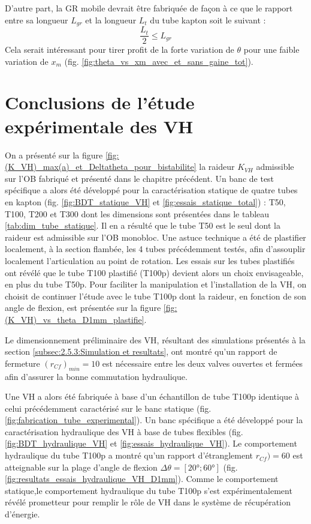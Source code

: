 D'autre part, la GR mobile devrait être fabriquée de façon à ce que le rapport entre sa longueur $L_{gr}$ et la longueur $L_t$ du tube kapton soit le suivant :
\begin{equation}
	\dfrac{L_t}{2} \leq L_{gr}
\end{equation}
Cela serait intéressant pour tirer profit de la forte variation de $\theta$ pour une faible variation de $x_m$ (fig. \ref{fig:theta_vs_xm_avec_et_sans_gaine_tot}).
	\section{Conclusions de l'étude expérimentale des VH}
	\label{sec:4.5_Conclusions de l etude experimentale des VH}
On a présenté sur la figure \ref{fig:(K_VH)_max(a)_et_Deltatheta_pour_bistabilite} la raideur $K_{VH}$ admissible sur l'OB fabriqué et présenté dans le chapitre précédent. Un banc de test spécifique a alors été développé pour la caractérisation statique de quatre tubes en kapton (fig. \ref{fig:BDT_statique_VH} et \ref{fig:essais_statique_total}) : T50, T100, T200 et T300 dont les dimensions sont présentées dans le tableau \ref{tab:dim_tube_statique}. Il en a résulté que le tube T50 est le seul dont la raideur est admissible sur l'OB monobloc. Une astuce technique a été de plastifier localement, à la section flambée, les 4 tubes précédemment testés, afin d'assouplir localement l'articulation au point de rotation. Les essais sur les tubes plastifiés ont révélé que le tube T100 plastifié (T100p) devient alors un choix envisageable, en plus du tube T50p. Pour faciliter la manipulation et l'installation de la VH, on choisit de continuer l'étude avec le tube T100p dont la raideur, en fonction de son angle de flexion, est présentée sur la figure \ref{fig:(K_VH)_vs_theta_D1mm_plastifie}.

Le dimensionnement préliminaire des VH, résultant des simulations présentés à la section \ref{subsec:2.5.3:Simulation et resultats}, ont montré qu'un rapport de fermeture $(r_{Cf})_{min}=10$ est nécessaire entre les deux valves ouvertes et fermées afin d'assurer la bonne commutation hydraulique.

Une VH a alors été fabriquée à base d'un échantillon de tube T100p identique à celui précédemment caractérisé sur le banc statique (fig. \ref{fig:fabrication_tube_experimental}). Un banc spécifique a été développé pour la caractérisation hydraulique des VH à base de tubes flexibles (fig. \ref{fig:BDT_hydraulique_VH} et \ref{fig:essais_hydraulique_VH}). Le comportement hydraulique du tube T100p a montré qu'un rapport d'étranglement $r_{Cf})=60$ est atteignable sur la plage d'angle de flexion $\Delta\theta =[\ang{20};\ang{60}]$ (fig. \ref{fig:resultats_essais_hydraulique_VH_D1mm}). Comme le comportement statique,le comportement hydraulique du tube T100p s'est expérimentalement révélé prometteur pour remplir le rôle de VH dans le système de récupération d'énergie.
	

